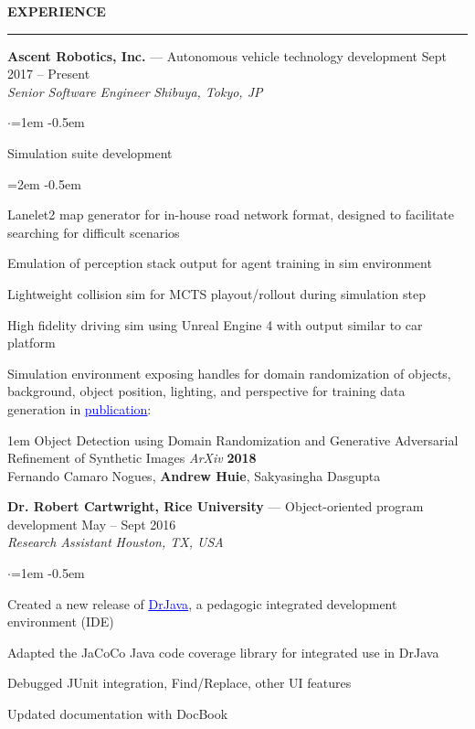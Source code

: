 \documentclass[10pt, a4paper]{article}
\newenvironment{aSection}[1]{
    \medskip \textbf{\uppercase{#1}}
    \smallskip
    \hrule
    \begin{list}{}{
            \setlength{\leftmargin}{1.5em}
        }
    \item[]
    }{
    \end{list}
}
\newenvironment{aSubsection}[4]{
    {#1} \hfill {#2} \\
    \textit{#3} \hfill \textit{#4}
    \smallskip
    \begin{list}{$\cdot$}{\leftmargin=1em}
    \itemsep -0.5em \vspace{-0.5em}
    }{
    \end{list}
    \vspace{0.5em}
}
\begin{document}
\begin{aSection}{Experience}
    \begin{aSubsection}
        {\textbf{Ascent Robotics, Inc.} --- Autonomous vehicle technology development}
        {Sept 2017 -- Present}
        {Senior Software Engineer}
        {Shibuya, Tokyo, JP}
    \item Simulation suite development
        \begin{list}{\raisebox{.4ex}{\tiny$\succ$}}{\leftmargin=2em}
            \itemsep -0.5em \vspace{-0.5em}
            \item Lanelet2 map generator for in-house road network format, designed to facilitate
                searching for difficult scenarios
            \item Emulation of perception stack output for agent training in sim environment
            \item Lightweight collision sim for MCTS playout/rollout during simulation step
            \item High fidelity driving sim using Unreal Engine 4 with output similar to car
                platform
        \end{list}
    \item Simulation environment exposing handles for domain randomization of objects, background,
        object position, lighting, and perspective for training data generation in
        \href{https://arxiv.org/abs/1805.11778}{\textcolor{blue}{\underline{publication}}}:
        \begin{adjustwidth}{1em}{}
            \vspace{-0.5em}
            Object Detection using Domain Randomization and Generative Adversarial Refinement
            of Synthetic Images \textit{ArXiv} \textbf{2018}\\
            Fernando Camaro Nogues, \textbf{Andrew Huie}, Sakyasingha Dasgupta

        \end{adjustwidth}
    \end{aSubsection}

    \begin{aSubsection}
        {\textbf{Dr. Robert Cartwright, Rice University} --- Object-oriented program development}
        {May -- Sept 2016}
        {Research Assistant}
        {Houston, TX, USA}
    \item Created a new release of
        \href{http://www.drjava.org}{\textcolor{blue}{\underline{DrJava}}}, a pedagogic integrated
        development environment (IDE)
    \item Adapted the JaCoCo Java code coverage library for integrated use in DrJava
    \item Debugged JUnit integration, Find/Replace, other UI features
    \item Updated documentation with DocBook
    \end{aSubsection}


\end{aSection}
\end{document}
